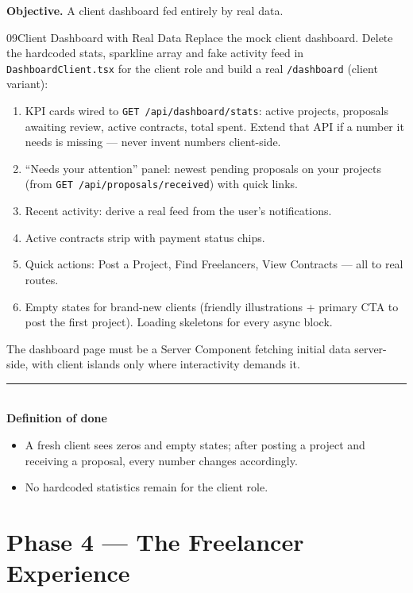 \documentclass[11pt,a4paper]{article}
\newcommand{\dod}{\medskip\noindent\textcolor{donegreen}{\rule{\linewidth}{0.5pt}}\\[1mm]\textbf{\textcolor{donegreen}{Definition of done}}\\[-2mm]}
\newcommand{\objective}[1]{\noindent\textbf{Objective.} #1\medskip}
\newcommand{\filepath}[1]{\texttt{#1}}
\begin{document}
\objective{A client dashboard fed entirely by real data.}

\begin{promptbox}{09}{Client Dashboard with Real Data}
Replace the mock client dashboard. Delete the hardcoded stats, sparkline array and
fake activity feed in \filepath{DashboardClient.tsx} for the client role and build a
real \texttt{/dashboard} (client variant):

\begin{enumerate}[leftmargin=1.6em]
  \item KPI cards wired to \texttt{GET /api/dashboard/stats}: active projects,
        proposals awaiting review, active contracts, total spent. Extend that API if a
        number it needs is missing --- never invent numbers client-side.
  \item ``Needs your attention'' panel: newest pending proposals on your projects
        (from \texttt{GET /api/proposals/received}) with quick links.
  \item Recent activity: derive a real feed from the user's notifications.
  \item Active contracts strip with payment status chips.
  \item Quick actions: Post a Project, Find Freelancers, View Contracts --- all to
        real routes.
  \item Empty states for brand-new clients (friendly illustrations + primary CTA to
        post the first project). Loading skeletons for every async block.
\end{enumerate}
The dashboard page must be a Server Component fetching initial data server-side,
with client islands only where interactivity demands it.

\dod
\begin{itemize}[leftmargin=1.6em]
  \item A fresh client sees zeros and empty states; after posting a project and
        receiving a proposal, every number changes accordingly.
  \item No hardcoded statistics remain for the client role.
\end{itemize}
\end{promptbox}

\section{Phase 4 --- The Freelancer Experience}
\end{document}
